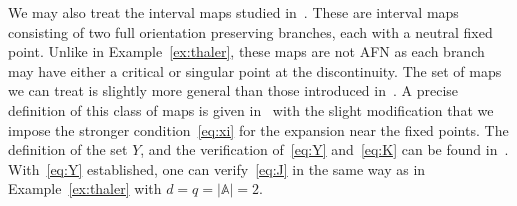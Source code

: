 \documentclass[12pt]{article}
\numberwithin{equation}{section}
\newcommand{\bbA}{{\mathbb A}}
\begin{document}
\begin{example}\label{ex:sing}
	We may also treat the interval maps studied in~\cite{CoaLuz2024,CoaLuzMub2023}. These are interval maps consisting of two full orientation preserving branches, each with a neutral fixed point. Unlike in Example~\ref{ex:thaler}, these maps are not AFN as each branch may have either a critical or singular point at the discontinuity. The set of maps we can treat is slightly more general than those introduced in~\cite{CoaLuzMub2023}. A precise definition of this class of maps is given in~\cite[Section 4.2]{CMTsub} with the slight modification that we impose the stronger condition~\eqref{eq:xi} for the expansion near the fixed points. The definition of the set $Y$, and the verification of~\eqref{eq:Y} and~\eqref{eq:K} can be found in~\cite[Section 4.2]{CMTsub}. With~\eqref{eq:Y} established, one can verify~\eqref{eq:J} in the same way as in Example~\ref{ex:thaler} with $d=q=|\bbA|=2$. 
\end{example}
\end{document}
